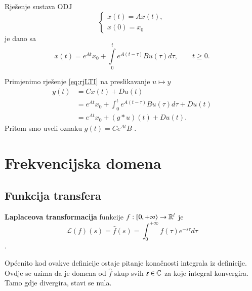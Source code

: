 \begin{prop}
    Rješenje sustava ODJ
    \begin{equation*}
        \begin{cases}
            \dot{x}(t) = Ax(t),\\
            x(0) = x_0
        \end{cases}
    \end{equation*} je dano sa
    \begin{equation}
        x(t) = e^{At}x_0 + \int\limits_0^t e^{A(t-\tau)}Bu(\tau) d\tau, \qquad t \geq 0.
        \label{eq:rjLTI}
    \end{equation}
\end{prop}

\begin{rem}
    Primjenimo rješenje \eqref{eq:rjLTI} na preslikavanje $u \mapsto y $
    \begin{align}
        y(t) &= C x(t) + D u(t) \\
             &= e^{At}x_0 + \int_0^t e^{A(t-\tau)}Bu(\tau) d\tau + D u(t)\\
             &= e^{At}x_0 + (g \ast u)(t) +  D u(t).
             \label{eq:MAPuy}
    \end{align} Pritom smo uveli oznaku $g(t)= C e^{At}B$ .    
\end{rem}

\section[Frekvencijska domena][Frekvencijska domena]{Frekvencijska domena}
\subsection{Funkcija transfera}

\begin{defn}
    \textbf{Laplaceova transformacija} funkcije $ f: \left[0, +\infty \right> \to \mathbb{R}^l$ je 
    $$\mathcal{L}(f)(s) = \hat{f}(s) = \int_0^{+\infty}f(\tau) e^{-s \tau}d\tau$$.
\end{defn}
\begin{rem}
    Općenito kod ovakve definicije ostaje pitanje konačnosti integrala iz definicije. Ovdje se uzima da je domena od $\hat{f}$ skup svih $s \in \mathbb{C}$ za koje integral konvergira. Tamo gdje divergira, stavi se nula.
\end{rem}

